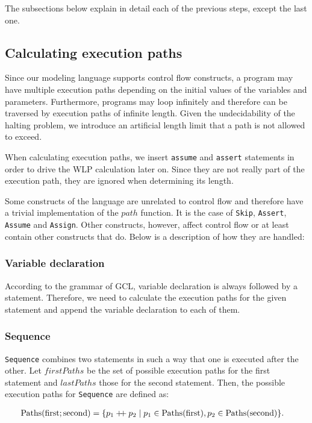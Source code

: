 \documentclass[a4paper]{article}
\newcommand\mdoubleplus{\ensuremath{\mathbin{+\mkern-5mu+}}}
\begin{document}
The subsections below explain in detail each of the previous steps, except the last
one.

\subsection{Calculating execution paths}

Since our modeling language supports control flow constructs, a program may have
multiple execution paths depending on the initial values of the variables and
parameters. Furthermore, programs may loop infinitely and therefore can be traversed
by execution paths of infinite length. Given the undecidability of the halting
problem, we introduce an artificial length limit that a path is not allowed to exceed.

When calculating execution paths, we insert \texttt{assume} and \texttt{assert}
statements in order to drive the WLP calculation later on. Since they are not
really part of the execution path, they are ignored when determining its length.

Some constructs of the language are unrelated to control flow and therefore have
a trivial implementation of the $path$ function. It is the case of \texttt{Skip},
\texttt{Assert}, \texttt{Assume} and \texttt{Assign}. Other constructs, however,
affect control flow or at least contain other constructs that do. Below is a
description of how they are handled:

\subsubsection*{Variable declaration}

According to the grammar of GCL, variable declaration is always followed by a
statement. Therefore, we need to calculate the execution paths for the given
statement and append the variable declaration to each of them.

\subsubsection*{Sequence}

\texttt{Sequence} combines two statements in such a way that one is executed
after the other. Let $firstPaths$ be the set of possible execution paths for
the first statement and $lastPaths$ those for the second statement. Then, the
possible execution paths for \texttt{Sequence} are defined as:

\begin{align*}
	\text{Paths}(\text{first} ; \text{second}) &= \{ p_1 \mdoubleplus p_2 \mid p_1 \in \text{Paths}(\text{first}), p_2 \in \text{Paths}(\text{second})\}.
\end{align*}
\end{document}
